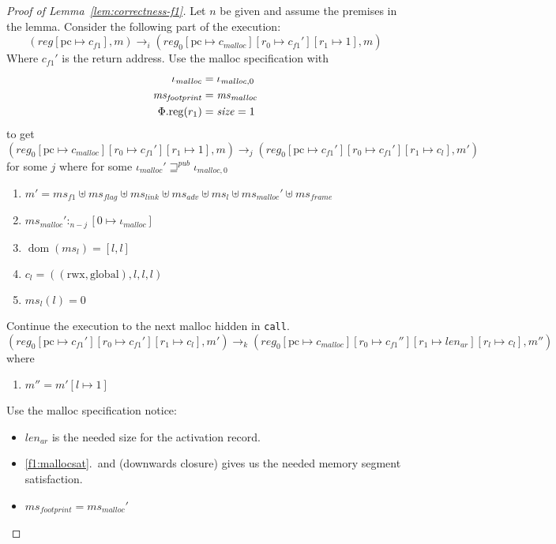 \documentclass[a4paper]{article}
\newcommand{\update}[2]{[#1 \mapsto #2]}
\DeclareMathOperator{\dom}{dom}
\newcommand{\var}[1]{\mathit{#1}}
\newcommand{\hs}{\var{ms}}
\newcommand{\ms}{\hs}
\newcommand{\pcreg}{\mathrm{pc}}
\newcommand{\reg}{\var{reg}}
\newcommand{\heap}{\var{mem}}
\newcommand{\adv}{\var{adv}}
\newcommand{\flag}{\var{flag}}
\newcommand{\plainproj}[1]{\mathrm{#1}}
\newcommand{\memreg}[1][\Phi]{#1.\plainproj{reg}}
\newcommand{\futurewk}{\mathbin{\sqsupseteq}^{\var{pub}}}
\newcommand{\heapSat}[3][\heap]{#1 :_{#2} #3}
\newcommand{\codelabel}[1]{\mathit{#1}}
\newcommand{\malloc}{\codelabel{malloc}}
\newcommand{\plainperm}[1]{\mathrm{#1}}
\newcommand{\rwx}{\plainperm{rwx}}
\newcommand{\glob}{\plainperm{global}}
\newcommand{\step}[1][]{\rightarrow_{#1}}
\begin{document}
\begin{proof}[Proof of Lemma~\ref{lem:correctness-f1}]
  Let $n$ be given and assume the premises in the lemma.  Consider the following part of the execution:
  \[
    (\reg\update{\pcreg}{c_{f1}},m) \step[i] (\reg_0\update{\pcreg}{c_\malloc}\update{r_0}{c_{f1}'}\update{r_1}{1},m)
  \]
  Where $c_{f1}'$ is the return address. Use the malloc specification with
  \begin{align*}
    \iota_\malloc &= \iota_{\malloc,0} \\
    \ms_{\var{footprint}} & = \ms_\malloc \\
    \memreg(r_1) & = \size = 1
  \end{align*}
  to get 
  \[
    (\reg_0\update{\pcreg}{c_\malloc}\update{r_0}{c_{f1}'}\update{r_1}{1},m) \step[j] (\reg_0\update{\pcreg}{c_{f1}'}\update{r_0}{c_{f1}'}\update{r_1}{c_l},m')
  \]
  for some $j$ where for some $\iota_{\malloc}' \futurewk \iota_{\malloc,0}$
  \begin{enumerate}
  \item $m' = \hs_{f1} \uplus 
    \hs_\flag \uplus                
    \ms_{\var{link}} \uplus 
    \hs_\adv \uplus 
    \ms_l \uplus
    \ms_{\malloc}' \uplus 
    \hs_{\var{frame}} $
  \item $\heapSat[\ms_{\malloc}']{n-j}{[0 \mapsto \iota_{\malloc}]}$ \label{f1:mallocsat}
  \item $\dom(\hs_l) = [l,l]$
  \item $c_l = ((\rwx,\glob),l,l,l)$ \label{test}
  \item $\ms_l(l) = 0$
  \end{enumerate}
  Continue the execution to the next malloc hidden in \texttt{call}.
  \[
    (\reg_0\update{\pcreg}{c_{f1}'}\update{r_0}{c_{f1}'}\update{r_1}{c_l},m')
    \step[k]
    (\reg_0\update{\pcreg}{c_\malloc}\update{r_0}{c_{f1}''}\update{r_1}{\var{len}_{\var{ar}}}\update{r_l}{c_l},m'')
  \]
  where
  \begin{enumerate}[resume]
  \item $m'' = m'[l\mapsto 1]$
  \end{enumerate}
  Use the malloc specification notice:
  \begin{itemize}
  \item $\var{len}_{\var{ar}}$ is the needed size for the activation record. 
  \item \ref{f1:mallocsat}.\ and (downwards closure) gives us the needed memory segment satisfaction.
  \item $\ms_{\var{footprint}} =  \ms_\malloc' $

\end{itemize}
\end{proof}
\end{document}
